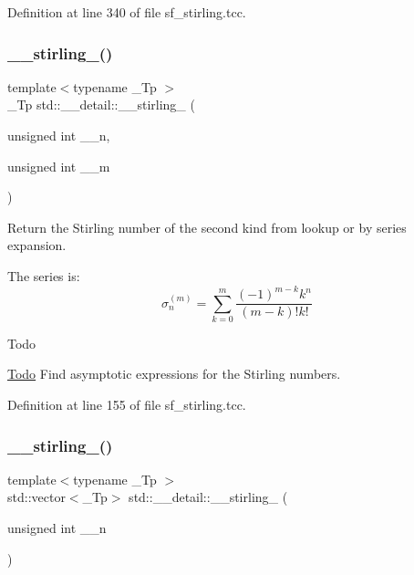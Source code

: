 Definition at line 340 of file sf\+\_\+stirling.\+tcc.

\mbox{\label{namespacestd_1_1____detail_a4589d459a7a9d1d9e19b33601238a4af}} 
\subsubsection{\texorpdfstring{\+\_\+\+\_\+stirling\+\_()}{\_\_stirling\_2()}\hspace{0.1cm}{\footnotesize\ttfamily [1/2]}}
{\footnotesize\ttfamily template$<$typename \+\_\+\+Tp $>$ \\
\+\_\+\+Tp std\+::\+\_\+\+\_\+detail\+::\+\_\+\+\_\+stirling\+\_ (\begin{DoxyParamCaption}\item[{unsigned int}]{\+\_\+\+\_\+n,  }\item[{unsigned int}]{\+\_\+\+\_\+m }\end{DoxyParamCaption})}

Return the Stirling number of the second kind from lookup or by series expansion.

The series is\+: \[ \sigma_n^{(m)} = \sum_{k=0}^{m}\frac{(-1)^{m-k}k^n}{(m-k)!k!} \]

\begin{DoxyRefDesc}{Todo}
\item[\hyperlink{todo__todo000012}{Todo}]Find asymptotic expressions for the Stirling numbers. \end{DoxyRefDesc}


Definition at line 155 of file sf\+\_\+stirling.\+tcc.

\mbox{\label{namespacestd_1_1____detail_a286c6f5a5de7aa8493aa5a8bf491b26e}} 
\subsubsection{\texorpdfstring{\+\_\+\+\_\+stirling\+\_()}{\_\_stirling\_2()}\hspace{0.1cm}{\footnotesize\ttfamily [2/2]}}
{\footnotesize\ttfamily template$<$typename \+\_\+\+Tp $>$ \\
std\+::vector$<$\+\_\+\+Tp$>$ std\+::\+\_\+\+\_\+detail\+::\+\_\+\+\_\+stirling\+\_ (\begin{DoxyParamCaption}\item[{unsigned int}]{\+\_\+\+\_\+n }\end{DoxyParamCaption})}

